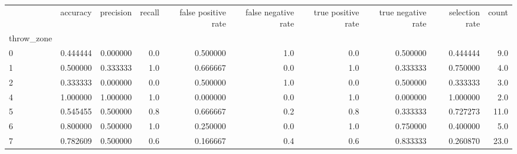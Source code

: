 \begin{tabular}{lrrrrrrrrr}
\toprule
{} &  accuracy &  precision &  recall &  false positive rate &  false negative rate &  true positive rate &  true negative rate &  selection rate &  count \\
throw\_zone &           &            &         &                      &                      &                     &                     &                 &        \\
\midrule
0          &  0.444444 &   0.000000 &     0.0 &             0.500000 &                  1.0 &                 0.0 &            0.500000 &        0.444444 &    9.0 \\
1          &  0.500000 &   0.333333 &     1.0 &             0.666667 &                  0.0 &                 1.0 &            0.333333 &        0.750000 &    4.0 \\
2          &  0.333333 &   0.000000 &     0.0 &             0.500000 &                  1.0 &                 0.0 &            0.500000 &        0.333333 &    3.0 \\
4          &  1.000000 &   1.000000 &     1.0 &             0.000000 &                  0.0 &                 1.0 &            0.000000 &        1.000000 &    2.0 \\
5          &  0.545455 &   0.500000 &     0.8 &             0.666667 &                  0.2 &                 0.8 &            0.333333 &        0.727273 &   11.0 \\
6          &  0.800000 &   0.500000 &     1.0 &             0.250000 &                  0.0 &                 1.0 &            0.750000 &        0.400000 &    5.0 \\
7          &  0.782609 &   0.500000 &     0.6 &             0.166667 &                  0.4 &                 0.6 &            0.833333 &        0.260870 &   23.0 \\
\bottomrule
\end{tabular}
